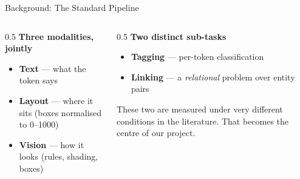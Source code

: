 \documentclass[aspectratio=169, 11pt]{beamer}
\begin{document}
\begin{frame}{Background: The Standard Pipeline}
  \begin{center}
  \end{center}

  \medskip
  \begin{columns}[T]
    \begin{column}{0.5\textwidth}
      \textbf{Three modalities, jointly}
      \begin{itemize}\small
        \item \textbf{Text} — what the token says
        \item \textbf{Layout} — where it sits (boxes normalised to 0--1000)
        \item \textbf{Vision} — how it looks (rules, shading, boxes)
      \end{itemize}
    \end{column}
    \begin{column}{0.5\textwidth}
      \textbf{Two distinct sub-tasks}
      \begin{itemize}\small
        \item \textbf{Tagging} — per-token classification
        \item \textbf{Linking} — a \emph{relational} problem over entity pairs
      \end{itemize}
      {\small\color{warn} These two are measured under very different conditions in the literature. That becomes the centre of our project.}
    \end{column}
  \end{columns}
\end{frame}
\end{document}
